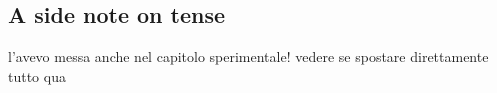 

\subsection{A side note on tense}
l'avevo messa anche nel capitolo sperimentale! vedere se spostare direttamente tutto qua


